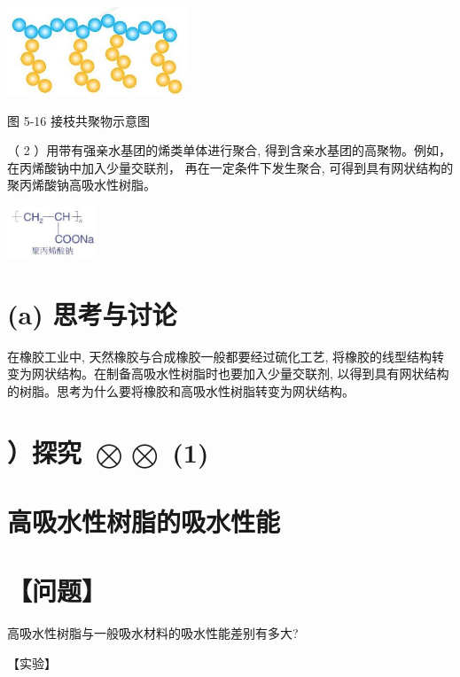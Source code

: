 \documentclass[10pt]{article}
\begin{document}
\begin{center}
\includegraphics[max width=0.4\textwidth]{images/0190efc5-b58a-7c43-bfb0-e0a030df9cfd_151_515691.jpg}
\end{center}

图 5-16 接枝共聚物示意图

（ 2 ）用带有强亲水基团的烯类单体进行聚合, 得到含亲水基团的高聚物。例如，在丙烯酸钠中加入少量交联剂， 再在一定条件下发生聚合, 可得到具有网状结构的聚丙烯酸钠高吸水性树脂。

\begin{center}
\includegraphics[max width=0.2\textwidth]{images/0190efc5-b58a-7c43-bfb0-e0a030df9cfd_151_281657.jpg}
\end{center}

\section*{(a) 思考与讨论}

在橡胶工业中, 天然橡胶与合成橡胶一般都要经过硫化工艺, 将橡胶的线型结构转变为网状结构。在制备高吸水性树脂时也要加入少量交联剂, 以得到具有网状结构的树脂。思考为什么要将橡胶和高吸水性树脂转变为网状结构。

\section*{）探究 \(\bigotimes \bigotimes\) (1)}

\section*{高吸水性树脂的吸水性能}

\section*{【问题】}

高吸水性树脂与一般吸水材料的吸水性能差别有多大?

【实验】
\end{document}

